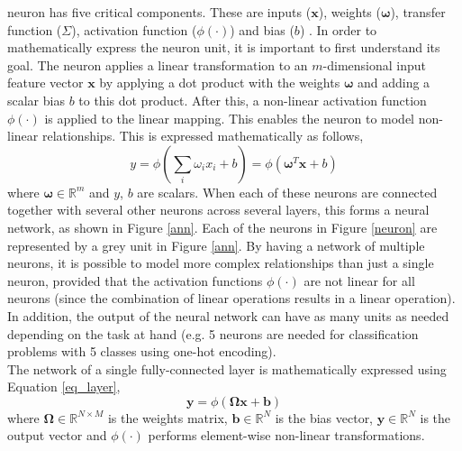  neuron has five critical components. These are inputs ($\bm{x}$), weights ($\bm{\omega}$), transfer 
 function ($\Sigma$), activation function ($\phi(\cdot)$) and bias ($b$) \cite{deeplearning}. In order to mathematically 
 express the neuron unit, it is important to first understand its goal. The neuron
 applies a linear transformation to an $m$-dimensional input feature
vector $\mathbf{x}$ by applying a dot product with the weights $\bm{\omega}$ and 
adding a scalar bias $b$ to this dot product. After this, a non-linear 
activation function $\phi(\cdot)$ is applied to the linear mapping. This enables the 
neuron to model non-linear relationships. This is expressed mathematically as follows,
\begin{equation}\label{eq_neuron}
    y = \phi(\sum_{i} \omega_i x_i + b ) = \phi (\bm{\omega}^T \mathbf{x} + b)
\end{equation}\noindent where $\bm{\omega} \in \mathbb{R}^m$ 
and $y$, $b$ are scalars. When each of these neurons are connected together with several other 
neurons across several layers, this forms a neural network, as shown in Figure \ref{ann}. Each of the 
neurons in Figure \ref{neuron} are represented by a grey unit in Figure \ref{ann}.
By having a network of multiple neurons, it is possible to model more 
complex relationships than just a single neuron, provided that the activation functions $\phi(\cdot)$ are not linear for all
neurons (since the combination of linear operations results in a linear operation). In addition,
the output of the neural network can have as many units as needed depending on the task
at hand (e.g. 5 neurons are needed for classification problems with 5 classes using one-hot
encoding).\\ \newline \noindent The network of a single fully-connected layer is mathematically expressed using Equation \ref{eq_layer}, 
\begin{equation}\label{eq_layer}
    \mathbf{y} = \phi (\bm{\Omega} \mathbf{x} + \mathbf{b})
\end{equation}\noindent where $\bm{\Omega} \in \mathbb{R}^{N \times M}$ is the weights matrix, 
$\mathbf{b} \in \mathbb{R}^N$ is the bias vector, $\mathbf{y} \in \mathbb{R}^N$ is the output 
vector and $\phi(\cdot)$ performs element-wise non-linear transformations.

